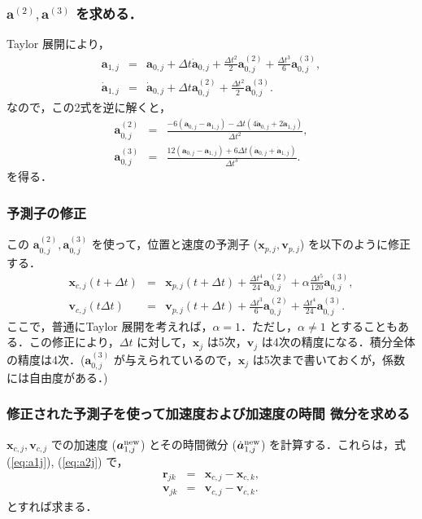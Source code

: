 \documentclass[11pt,a4paper,oneside,onecolumn]{jarticle}
\begin{document}
\subsubsection{${\bm a}^{(2)}, {\bm a}^{(3)}$ を求める．\label{sec:corrector}}
Taylor 展開により，
\begin{eqnarray}
{\bm a}_{1,j} & = & {\bm a}_{0,j} + \Delta t \dot{{\bm a}}_{0,j} + \frac{\Delta t ^2}{2} {\bm a}_{0,j}^{(2)} + \frac{\Delta t ^3}{6} {\bm a}_{0,j}^{(3)}, \\
\dot{{\bm a}}_{1,j} & = & \dot{{\bm a}}_{0,j} + \Delta t {\bm a}_{0,j}^{(2)} + \frac{\Delta t ^2}{2} {\bm a}_{0,j}^{(3)}. 
\end{eqnarray}
なので，この2式を逆に解くと，
\begin{eqnarray}
{\bm a}_{0,j}^{(2)} & = & \frac{- 6 ({\bm a}_{0,j} - {\bm a}_{1,j}) - \Delta t (4 \dot{{\bm a}}_{0,j} + 2 \dot{{\bm a}}_{1,j})}{\Delta t ^2}, \\
{\bm a}_{0,j}^{(3)} & = & \frac{12 ({\bm a}_{0,j} - {\bm a}_{1,j}) + 6 \Delta t (\dot{{\bm a}}_{0,j} + \dot{{\bm a}}_{1,j})}{\Delta t ^3}. 
\end{eqnarray}
を得る．

\subsubsection{予測子の修正}
この ${\bm a}_{0,j}^{(2)}, {\bm a}_{0,j}^{(3)}$ を使って，位置と速度の予測子 (${\bm x}_{p,j}, {\bm v}_{p,j}$) を以下のように修正する．
\begin{eqnarray}
{\bm x}_{c,j} (t + \Delta t) & = & {\bm x}_{p,j} (t + \Delta t) +  \frac{\Delta t ^4}{24} {\bm a}_{0,j}^{(2)} + \alpha \frac{\Delta t ^5}{120} {\bm a}_{0,j}^{(3)}, \\
{\bm v}_{c,j} (t \Delta t) & = & {\bm v}_{p,j} (t +\Delta t) + \frac{\Delta t ^3}{6} {\bm a}_{0,j}^{(2)} + \frac{\Delta t ^4}{24} {\bm a}_{0,j}^{(3)}. 
\end{eqnarray}
ここで，普通にTaylor 展開を考えれば，$\alpha = 1$．ただし，$\alpha \not= 1$ とすることもある．この修正により，$\Delta t$ に対して，${\bm x}_j$ は5次，${\bm v}_j$ は4次の精度になる．積分全体の精度は4次．(${\bm a}_{0,j}^{(3)}$ が与えられているので，${\bm x}_j$ は5次まで書いておくが，係数には自由度がある．)

\subsubsection{修正された予測子を使って加速度および加速度の時間
微分を求める}
${\bm x}_{c,j}, {\bm v}_{c,j}$ での加速度 (${\bm a}_{1,j}^{\rm new}$) とその時間微分 ($\dot{{\bm a}}_{1,j}^{\rm new}$) を計算する．これらは，式 (\ref{eq:a1j}), (\ref{eq:a2j}) で，
\begin{eqnarray}
{\bm r}_{jk} & = & {\bm x}_{c,j} - {\bm x}_{c,k}, \\
{\bm v}_{jk} & = & {\bm v}_{c,j} - {\bm v}_{c,k}. 
\end{eqnarray}
とすれば求まる．
\end{document}
